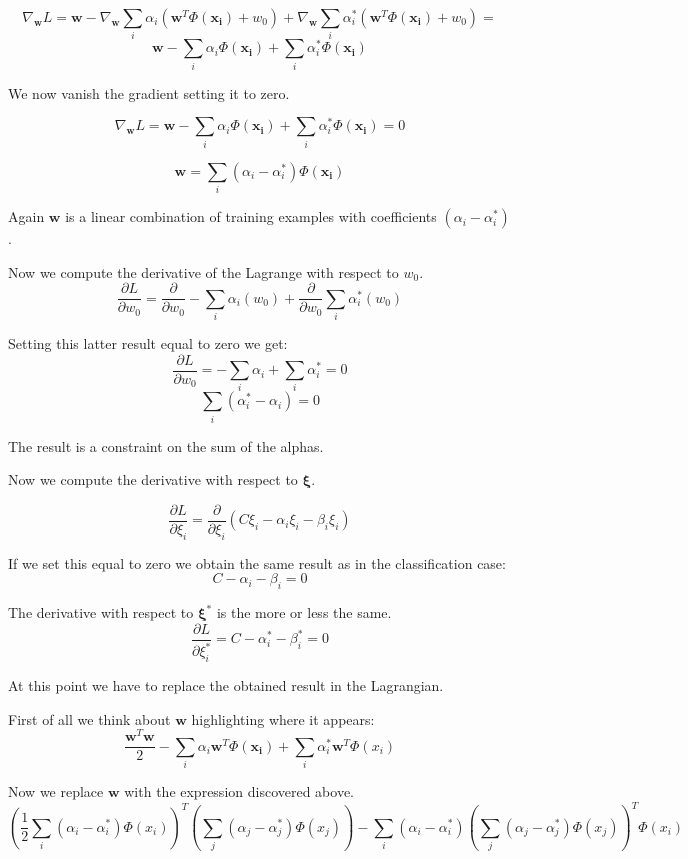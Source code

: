 $$\nabla_{\pmb{w}} L = \pmb{w} - \nabla_{\pmb{w}} \sum_i \alpha_i (\pmb{w}^T \Phi(\pmb{x_i}) + w_0) + \nabla_{\pmb{w}} \sum_i \alpha_i^* (\pmb{w}^T \Phi(\pmb{x_i}) + w_0) = $$
$$\pmb{w} - \sum_i \alpha_i \Phi(\pmb{x_i}) + \sum_i \alpha_i^* \Phi(\pmb{x_i})$$

We now vanish the gradient setting it to zero.

$$\nabla_{\pmb{w}} L = \pmb{w} - \sum_i \alpha_i \Phi(\pmb{x_i}) + \sum_i \alpha_i^* \Phi(\pmb{x_i}) = 0$$

$$\pmb{w} = \sum_i (\alpha_i-\alpha_i^*) \Phi(\pmb{x_i})$$

Again $\pmb{w}$ is a linear combination of training examples with coefficients $(\alpha_i - \alpha_i^*)$. \newline

Now we compute the derivative of the Lagrange with respect to $w_0$.
$$
\frac{\partial L}{\partial w_0} = \frac{\partial}{\partial w_0} - \sum_i \alpha_i (w_0) + \frac{\partial}{\partial w_0} \sum_i \alpha_i^* (w_0)
$$

Setting this latter result equal to zero we get:
$$\frac{\partial L}{\partial w_0} = - \sum_i \alpha_i + \sum_i \alpha_i^* = 0$$
$$\sum_i (\alpha_i^* - \alpha_i) = 0$$

The result is a constraint on the sum of the alphas. \newline

Now we compute the derivative with respect to $\pmb{\xi}$.

$$\frac{\partial L}{\partial \xi_i} = \frac{\partial }{\partial \xi_i} (C \xi_i - \alpha_i \xi_i - \beta_i \xi_i)$$

If we set this equal to zero we obtain the same result as in the classification case:
$$C - \alpha_i - \beta_i = 0$$ \newline

The derivative with respect to $\pmb{\xi}^*$ is the more or less the same.
$$\frac{\partial L}{\partial \xi_i^*} = C - \alpha_i^* - \beta_i^* = 0$$

At this point we have to replace the obtained result in the Lagrangian. \newline

First of all we think about $\pmb{w}$ highlighting where it appears:
$$\frac{\pmb{w}^T \pmb{w}}{2} - \sum_i \alpha_i \pmb{w}^T \Phi(\pmb{x_i}) + \sum_i \alpha_i^* \pmb{w}^T \Phi(x_i)$$

Now we replace $\pmb{w}$ with the expression discovered above.
$$(\frac{1}{2}\sum_i (\alpha_i - \alpha_i^*) \Phi(x_i))^T (\sum_j (\alpha_j - \alpha_j^*) \Phi(x_j)) - \sum_i(\alpha_i - \alpha_i^*) (\sum_j (\alpha_j - \alpha_j^*) \Phi(x_j))^T \Phi(x_i)$$

